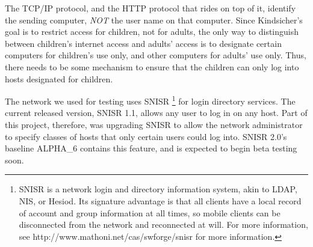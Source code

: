 The TCP/IP protocol, and the HTTP protocol that rides on top of it, identify
the sending computer, \emph{NOT} the user name on that computer.  
% 
Since Kindsicher's goal is to restrict access for children, not for adults,
the only way to distinguish between children's internet access and adults'
access is to designate certain computers for children's use only, and other
computers for adults' use only.  
%
Thus, there needs to be some mechanism to ensure that the children can only
log into hosts designated for children.

The network we used for testing uses SNISR 
%
\footnote{ SNISR is a network login and directory information system, akin to
LDAP, NIS, or Hesiod.  Its signature advantage is that all clients have a
local record of account and group information at all times, so mobile clients
can be disconnected from the network and reconnected at will.  For more
information, see http://www.mathoni.net/cas/swforge/snisr for more
information. }
%
for login directory services.  
%
The current released version, SNISR 1.1, allows any user to log in on any host.  
%
Part of this project, therefore, was upgrading SNISR to allow the network
administrator to specify classes of hosts that only certain users could log
into.
%
SNISR 2.0's baseline ALPHA_6 contains this feature, and is expected to begin
beta testing soon.


